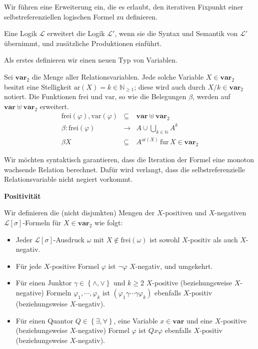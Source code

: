 Wir führen eine Erweiterung ein, die es erlaubt, den iterativen Fixpunkt
einer selbstreferenziellen logischen Formel zu definieren.
\begin{defn}
Eine Logik $\mathcal{L}$ erweitert die Logik $\mathcal{L}'$, wenn
sie die Syntax und Semantik von $\mathcal{L}'$ übernimmt, und zusätzliche
Produktionen einführt.
\end{defn}
Als erstes definieren wir einen neuen Typ von Variablen.
\begin{defn}
Sei $\mathbf{var}_{2}$ die Menge aller Relationsvariablen. Jede solche
Variable $X\in\mathbf{var}_{2}$ besitzt eine Stelligkeit $\mathrm{ar}\left(X\right)=k\in\mathbb{N}_{\geqslant1}$;
diese wird auch durch $X/k\in\mathbf{var}_{2}$ notiert. Die Funktionen
$\mathrm{frei}$ und $\mathrm{var}$, so wie die Belegungen $\beta$,
werden auf $\mathbf{var}\uplus\mathbf{var}_{2}$ erweitert.
\begin{eqnarray*}
\mathrm{frei}\left(\varphi\right),\mathrm{var}\left(\varphi\right) & \subseteq & \mathbf{var}\uplus\mathbf{var}_{2}\\
\beta:\mathrm{frei}\left(\varphi\right) & \rightarrow & A\cup\bigcup_{k\in\mathbb{N}}A^{k}\\
\beta X & \subseteq & A^{\mathrm{ar}\left(X\right)}\,\mathrm{f\ddot{u}r}\,X\in\mathbf{var}_{2}
\end{eqnarray*}
\end{defn}
Wir möchten syntaktisch garantieren, dass die Iteration der Formel
eine monoton wachsende Relation berechnet. Dafür wird verlangt, dass
die selbstreferenzielle Relationsvariable nicht negiert vorkommt.
\begin{defn}
\textbf{Positivität}

Wir definieren die (nicht disjunkten) Mengen der $X$-positiven und
$X$-negativen $\mathcal{L}\left[\sigma\right]$-Formeln für $X\in\mathbf{var}_{2}$
wie folgt:

\begin{itemize}
\item Jeder $\mathcal{L}\left[\sigma\right]$-Ausdruck $\omega$ mit $X\notin\mathrm{frei}\left(\omega\right)$
ist sowohl $X$-positiv als auch $X$-negativ.
\item Für jede $X$-positive Formel $\varphi$ ist $\neg\varphi$ $X$-negativ,
und umgekehrt.
\item Für einen Junktor $\gamma\in\left\{ \wedge,\vee\right\} $ und $k\geqslant2$
$X$-positive (beziehungsweise $X$-negative) Formeln $\varphi_{1},\cdots,\varphi_{k}$
ist $\left(\varphi_{1}\gamma\cdots\gamma\varphi_{k}\right)$ ebenfalls
$X$-positiv (beziehungsweise $X$-negativ).
\item Für einen Quantor $Q\in\left\{ \exists,\forall\right\} $, eine Variable
$x\in\mathbf{var}$ und eine $X$-positive (beziehungsweise $X$-negative)
Formel $\varphi$ ist $Qx\varphi$ ebenfalls $X$-positiv (beziehungsweise
$X$-negativ).
\end{itemize}
\end{defn}
